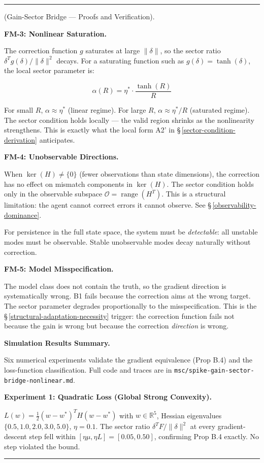 \documentclass[11pt,oneside]{article}
\newcounter{claim}[section]
\renewcommand{\theclaim}{\thesection.\arabic{claim}}
\newenvironment{segment}[2]{%
  \refstepcounter{claim}%
  \bigskip\noindent\hrule\smallskip
  \noindent{\bfseries #1~\theclaim}\enskip(#2).\par\smallskip
  \noindent\ignorespaces
}{%
  \par\smallskip\noindent\hrule\bigskip
}
\newenvironment{derivation}[1][]{\begin{segment}{Derivation}{#1}}{\end{segment}}
\begin{document}
\begin{derivation}[Gain-Sector Bridge — Proofs and Verification]
\medskip\noindent\textbf{FM-3: Nonlinear Saturation.}


The correction function $g$ saturates at large $\lVert\delta\rVert$, so the sector ratio $\delta^T g(\delta) / \lVert\delta\rVert^2$ decays. For a saturating function such as $g(\delta) = \tanh(\delta)$, the local sector parameter is:

$$\alpha(R) = \eta^* \cdot \frac{\tanh(R)}{R}$$

For small $R$, $\alpha \approx \eta^*$ (linear regime). For large $R$, $\alpha \approx \eta^* / R$ (saturated regime). The sector condition holds locally — the valid region shrinks as the nonlinearity strengthens. This is exactly what the local form A2' in \S\,\ref{sector-condition-derivation} anticipates.


\medskip\noindent\textbf{FM-4: Unobservable Directions.}


When $\ker(H) \neq \{0\}$ (fewer observations than state dimensions), the correction has no effect on mismatch components in $\ker(H)$. The sector condition holds only in the observable subspace $\mathcal{O} = \operatorname{range}(H^T)$. This is a structural limitation: the agent cannot correct errors it cannot observe. See \S\,\ref{observability-dominance}.

For persistence in the full state space, the system must be \textit{detectable}: all unstable modes must be observable. Stable unobservable modes decay naturally without correction.


\medskip\noindent\textbf{FM-5: Model Misspecification.}


The model class does not contain the truth, so the gradient direction is systematically wrong. B1 fails because the correction aims at the wrong target. The sector parameter degrades proportionally to the misspecification. This is the \S\,\ref{structural-adaptation-necessity} trigger: the correction function fails not because the gain is wrong but because the correction \textit{direction} is wrong.



\medskip\noindent\textbf{Simulation Results Summary.}


Six numerical experiments validate the gradient equivalence (Prop B.4) and the loss-function classification. Full code and traces are in \texttt{msc/spike-gain-sector-bridge-nonlinear.md}.


\medskip\noindent\textbf{Experiment 1: Quadratic Loss (Global Strong Convexity).}


$L(w) = \frac{1}{2}(w - w^*)^T H(w - w^*)$ with $w \in \mathbb{R}^5$, Hessian eigenvalues $\{0.5, 1.0, 2.0, 3.0, 5.0\}$, $\eta = 0.1$. The sector ratio $\delta^T F / \lVert\delta\rVert^2$ at every gradient-descent step fell within $[\eta\mu, \eta L] = [0.05, 0.50]$, confirming Prop B.4 exactly. No step violated the bound.



\end{derivation}
\end{document}
